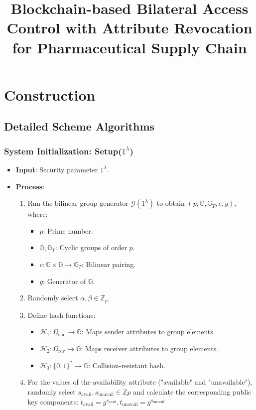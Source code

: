 \documentclass[runningheads]{llncs}
\begin{document}
\title{Blockchain-based Bilateral Access Control with Attribute Revocation for Pharmaceutical Supply Chain}

\section{Construction}
\subsection{Detailed Scheme Algorithms}

\subsubsection{System Initialization: Setup($1^\lambda$)}
\begin{itemize}
    \item \textbf{Input}: Security parameter $1^\lambda$.
    \item \textbf{Process}:
    \begin{enumerate}
        \item Run the bilinear group generator $\mathcal{G}(1^\lambda)$ to obtain $(p, \mathbb{G}, \mathbb{G}_T, e, g)$, where:
        \begin{itemize}
            \item $p$: Prime number.
            \item $\mathbb{G}, \mathbb{G}_T$: Cyclic groups of order $p$.
            \item $e: \mathbb{G} \times \mathbb{G} \to \mathbb{G}_T$: Bilinear pairing.
            \item $g$: Generator of $\mathbb{G}$.
        \end{itemize}
        \item Randomly select $\alpha, \beta \in \mathbb{Z}_p$.
        \item Define hash functions:
        \begin{itemize}
            \item $\mathcal{H}_1: \Omega_{\mathrm{snd}} \to \mathbb{G}$: Maps sender attributes to group elements.
            \item $\mathcal{H}_2: \Omega_{\mathrm{rcv}} \to \mathbb{G}$: Maps receiver attributes to group elements.
            \item $\mathcal{H}_3: \{0,1\}^* \to \mathbb{G}$: Collision-resistant hash.
        \end{itemize}
        \item For the values of the availability attribute ("available" and "unavailable"), randomly select $s_{\text{avail}}, s_{\text{unavail}} \in \mathbb{Z}p$ and calculate the corresponding public key components: $t_{\text{avail}} = g^{s_{\text{avail}}}, t_{\text{unavail}} = g^{s_{\text{unavail}}}$

\end{enumerate}
\end{itemize}
\end{document}
